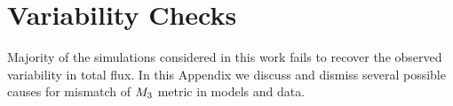 \section{Variability Checks}\label{app:variability}



Majority of the simulations considered in this work fails to recover the \sgra observed variability in total flux.
In this Appendix we discuss and dismiss several possible causes for mismatch of $M_{3}$ metric in models and data.













